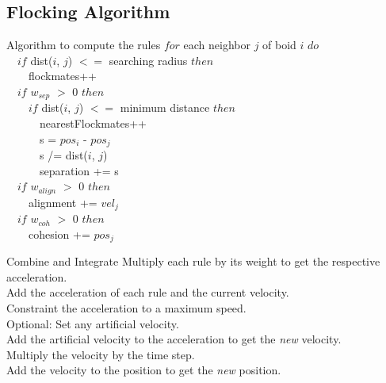 \documentclass[red]{beamer}
\begin{document}
\subsection{Flocking Algorithm}

\begin{frame}{Algorithm to compute the rules}
	\alert<1>{$for$ each neighbor $j$ of boid $i$ $do$}			\\
	\alert<2>{~~$if$ dist($i$, $j$) $<=$ searching radius $then$}	\\
	\alert<3>{~~~~flockmates++}							\\
	\alert<4>{~~$if$ $w_{sep}$ $>$ 0 $then$}					\\
	\alert<5>{~~~~$if$ dist($i$, $j$) $<=$ minimum distance $then$}	\\
	\alert<6>{~~~~~~nearestFlockmates++}						\\
	\alert<6>{~~~~~~s = $pos_i$ - $pos_j$} 					\\
	\alert<6>{~~~~~~s /= dist($i$, $j$)} 						\\
	\alert<6>{~~~~~~separation += s}							\\
	\alert<7>{~~$if$ $w_{align}$ $>$ 0 $then$}				\\
	\alert<7>{~~~~alignment += $vel_j$}						\\
	\alert<8>{~~$if$ $w_{coh}$ $>$ 0 $then$}					\\
	\alert<8>{~~~~cohesion += $pos_j$}						\\
\end{frame}

\begin{frame}{Combine and Integrate}
 	\alert<1>{Multiply each rule by its weight to get the respective acceleration.} 	\\
	\alert<2>{Add the acceleration of each rule and the current velocity.} 	\\
	\alert<3>{Constraint the acceleration to a maximum speed.}			\\ 
	\alert<4>{Optional: Set any artificial velocity.}						\\ 
	\alert<5>{Add the artificial velocity to the acceleration to get the \textit{new} velocity.} \\
	\alert<6>{Multiply the velocity by the time step.}			\\
	\alert<7>{Add the velocity to the position to get the \textit{new} position.}	\\
\end{frame}
\end{document}
